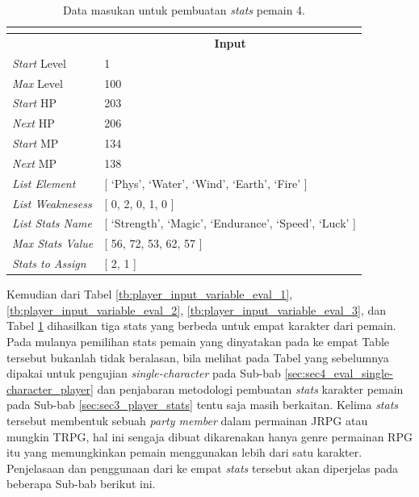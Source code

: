 \begin{longtable}{|l|l|}
	\caption{Data masukan untuk pembuatan \textit{stats} pemain 4.}
	\vspace{1ex}
	\label{tb:player_input_variable_eval_4}\\
	\hline
	\rowcolor[HTML]{9B9B9B} 
	\multicolumn{1}{|c|}{\cellcolor[HTML]{9B9B9B}\textbf{Variabel}} & \multicolumn{1}{c|}{\cellcolor[HTML]{9B9B9B}\textbf{Input}} \\ \hline
	\textit{Start} Level & 1 \\ \hline
	\textit{Max} Level & 100 \\ \hline
	\textit{Start} HP & 203 \\ \hline
	\textit{Next} HP & 206 \\ \hline
	\textit{Start} MP & 134 \\ \hline
	\textit{Next} MP & 138 \\ \hline
	\textit{List Element} & {[} `Phys', `Water', `Wind', `Earth', `Fire' {]} \\ \hline
	\textit{List Weaknesess} & {[} 0, 2, 0, 1, 0 {]} \\ \hline
	\textit{List Stats Name} & {[} `Strength', `Magic', `Endurance', `Speed', `Luck' {]} \\ \hline
	\textit{Max Stats Value} & {[} 56, 72, 53, 62, 57 {]} \\ \hline
	\textit{Stats to Assign} & {[} 2, 1 {]} \\ \hline
\end{longtable}

Kemudian dari Tabel \ref{tb:player_input_variable_eval_1}, \ref{tb:player_input_variable_eval_2}, \ref{tb:player_input_variable_eval_3}, dan Tabel \ref{tb:player_input_variable_eval_4} dihasilkan tiga stats yang berbeda untuk empat karakter dari pemain. Pada mulanya pemilihan stats pemain yang dinyatakan pada ke empat Table tersebut bukanlah tidak beralasan, bila melihat pada Tabel yang sebelumnya dipakai untuk pengujian \textit{single-character} pada Sub-bab \ref{sec:sec4_eval_single-character_player} dan penjabaran metodologi pembuatan \textit{stats} karakter pemain pada Sub-bab \ref{sec:sec3_player_stats} tentu saja masih berkaitan. Kelima \textit{stats} tersebut membentuk sebuah \textit{party member} dalam permainan JRPG atau mungkin TRPG, hal ini sengaja dibuat dikarenakan hanya genre permainan RPG itu yang memungkinkan pemain menggunakan lebih dari satu karakter. Penjelasaan dan penggunaan dari ke empat \textit{stats} tersebut akan diperjelas pada beberapa Sub-bab berikut ini.
\vspace{1ex}

